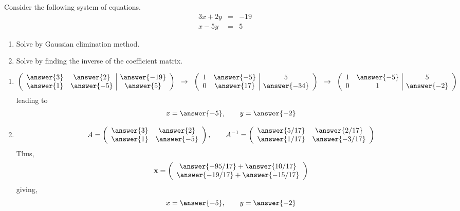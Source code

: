 \documentclass{ximera}
\begin{document}
\begin{exercise}
Consider the following system of equations.
\begin{eqnarray*}
3x+ 2y&=& -19\\
x-5y &=& 5
\end{eqnarray*}
\begin{enumerate}
\item Solve by Gaussian elimination method. 
\item Solve by finding the inverse of the coefficient matrix.
\end{enumerate}
\begin{prompt}
  \begin{enumerate}
\item
\[
\left(\begin{array}{cc|c}
\answer{3} & \answer{2} & \answer{-19}\\
\answer{1} & \answer{-5} & \answer{5}
\end{array}\right) \hspace{.2cm} \rightarrow \hspace{.2cm}
\left(\begin{array}{cc|c}
1 & \answer{-5} & 5\\
0 & \answer{17} & \answer{-34}
\end{array}\right)\hspace{.2cm} \rightarrow \hspace{.2cm}
\left(\begin{array}{cc|c}
1 & \answer{-5} & 5\\
0 & 1 & \answer{-2}
\end{array}\right)
\]
leading to
\begin{equation*}
x= \answer{-5}, \qquad y = \answer{-2}
\end{equation*}

\item 
\[A= \left(\begin{array}{cc}
\answer{3} & \answer{2}\\
\answer{1} & \answer{-5}
\end{array} \right), \qquad A^{-1}= \left(\begin{array}{cc}
\answer{5/17} & \answer{2/17}\\
\answer{1/17} & \answer{-3/17}
\end{array} \right)
\]
Thus,
\[
\textbf{x} = \left(\begin{array}{c}
\answer{-95/17} + \answer{10/17}\\
\answer{-19/17} + \answer{-15/17}
\end{array}\right)
\]
giving,
\[
x= \answer{-5}, \qquad y = \answer{-2}
\]
\end{enumerate}
\end{prompt}
\end{exercise}
\end{document}
